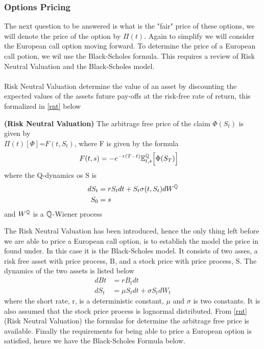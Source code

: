 \subsubsection{Options Pricing}
The next question to be answered is what is the "fair" price of these options, we will denote the price of
the option by $\Pi(t)$. Again to simplify we will consider
the European call option moving forward. To determine the price of a European call potion, we wil use the 
Black-Scholes formula. This requires a review of Risk Neutral Valuation and the Black-Scholes model.
\\\\
Risk Neutral Valuation determine the value of an asset by discounting the expected values of the assets future 
pay-offs at the risk-free rate of return, this formalized in \autoref{rnt} below
\begin{theorem}
    \textbf{(Risk Neutral Valuation)} The arbitrage free price of the claim $\Phi(S_t)$ is given by \\
    $\Pi(t)[\Phi]$=$F(t,S_t)$, where F is given by the formula 
    \begin{align*}
        F(t,s) &= -e^{-r(T-t)} \mathbb{E}_{t,s}^{\mathbb{Q}} \Big[\Phi(S_T)\Big]
    \end{align*}
    where the Q-dynamics os S is
    \begin{align*}
        dS_t & = r S_t dt + S_t \sigma(t,S_t) dW^{\mathbb{Q}} \\
        S_0 & = s
    \end{align*}
    and $W^{\mathbb{Q}}$ is a $\mathbb{Q}$-Wiener process \cite{Bjork}
    \label{rnt}
\end{theorem}
\noindent 
The Risk Neutral Valuation has been introduced, hence the only thing left before we are able to price a 
European call option, is to establish the model the price in found under. In this case it is the Black-Scholes model.
It consists of two asses, a risk free asset with price process, B, and a stock price with price process, S.
The dynamics of the two assets is listed below
\begin{align*}
    dBt & = rB_t dt \\
    dS_t &= \mu S_t dt + \sigma S_t dW_t
\end{align*}
where the short rate, r, is  a deterministic constant,  $\mu$ and $\sigma$ is two constants. It is also assumed
that the stock price process is lognormal distributed. From \autoref{rnt}
(Risk Neutral Valuation) the formulas for determine the arbitrage free price is available. Finally the requirements
for being able to price a European option is satisfied, hence we have the Black-Scholes Formula below.
